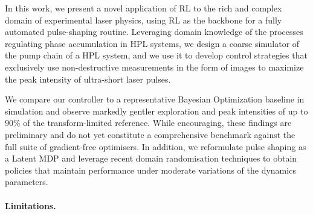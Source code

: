 In this work, we present a novel application of RL to the rich and complex domain of experimental laser physics, using RL as the backbone for a fully automated pulse-shaping routine. Leveraging domain knowledge of the processes regulating phase accumulation in HPL systems, we design a coarse simulator of the pump chain of a HPL system, and we use it to develop control strategies that exclusively use non-destructive measurements in the form of images to maximize the peak intensity of ultra-short laser pulses.

We compare our controller to a representative Bayesian Optimization baseline in simulation and observe markedly gentler exploration and peak intensities of up to $90\%$ of the transform-limited reference. While encouraging, these findings are preliminary and do not yet constitute a comprehensive benchmark against the full suite of gradient-free optimisers. In addition, we reformulate pulse shaping as a Latent MDP and leverage recent domain randomisation techniques to obtain policies that maintain performance under moderate variations of the dynamics parameters.

\paragraph{Limitations.}




